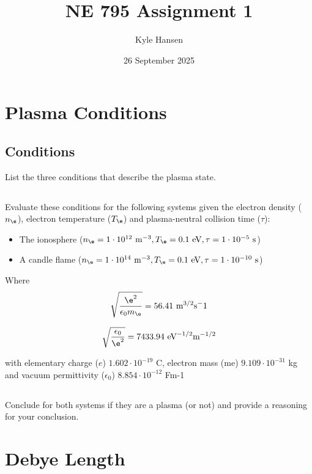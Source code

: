 \documentclass{template}
\title{NE 795 Assignment 1}
\author{Kyle Hansen}
\date{26 September 2025}
\begin{document}
\maketitle

\section{Plasma Conditions}

\subsection{Conditions}

List the three conditions that describe the plasma state.

\subsection{}

Evaluate these conditions for the following systems given the electron density ($n_\e$),
electron temperature ($T_\e$) and plasma-neutral collision time ($\tau$):

\begin{itemize}
    \item The ionosphere ($n_\e = 1\cdot 10^{12}\text{ m}^{-3}, T_\e = 0.1\text{ eV}, \tau = 1\cdot 10^{-5}\text{ s}$)
    \item A candle flame ($n_\e = 1\cdot 10^{14}\text{ m}^{-3}, T_\e = 0.1\text{ eV}, \tau = 1\cdot 10^{-10}\text{ s}$)
\end{itemize}

Where
\[
\sqrt{\frac{\e^2}{\epsilon_0 m_\e}} = 56.41 \text{ m}^{3/2}\text{s}^-1
\]

\[
\sqrt{\frac{\epsilon_0}{\e^2}} = 7433.94\text{ eV}^{-1/2}\text{m}^{-1/2}
\]

with elementary charge ($e$) $1.602\cdot10^{-19}$ C, electron mass (me) $9.109\cdot10^{-31}$ kg and vacuum permittivity ($\epsilon_0$) $8.854 \cdot 10^{-12}$ Fm-1

\subsection{}

Conclude for both systems if they are a plasma (or not) and provide a reasoning for your conclusion.

\section{Debye Length}
\end{document}
